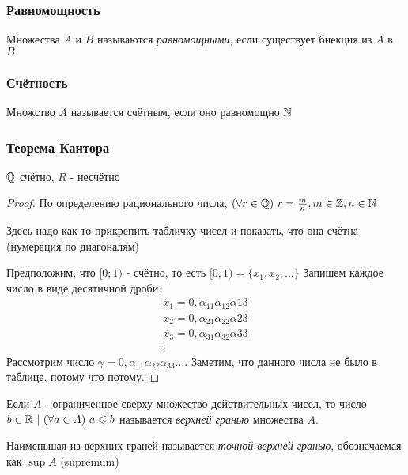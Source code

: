 \subsubsection*{Равномощность}

\begin{definition}
    Множества $A$ и $B$ называются \textit{равномощными}, если существует биекция из $A$ в $B$
\end{definition}

\subsubsection*{Счётность}

\begin{definition}
    Множство $A$ называется счётным, если оно равномощно $\mathbb{N}$
\end{definition}

\subsubsection*{Теорема Кантора}

\begin{proposition}
    $\mathbb{Q}$ счётно, $R$ - несчётно
\end{proposition}

\begin{proof}
    По определению рационального числа, $(\forall r \in \mathbb{Q})\ r = \frac{m}{n}, m \in \mathbb{Z}, n \in \mathbb{N}$
    
    Здесь надо как-то прикрепить табличку чисел и показать, что она счётна (нумерация по диагоналям)
    
    Предположим, что $[0; 1)$ - счётно, то есть $[0, 1) = \{x_1, x_2, \dots\}$
    Запишем каждое число в виде десятичной дроби:
    \begin{align*}
        x_1 = 0, \alpha_{11} \alpha_{12} \alpha{13} \\
        x_2 = 0, \alpha_{21} \alpha_{22} \alpha{23} \\
        x_3 = 0, \alpha_{31} \alpha_{32} \alpha{33} \\
        \vdots
    \end{align*}
    Рассмотрим число $\gamma = 0, \alpha_{11} \alpha_{22} \alpha_{33} \dots$. Заметим, что данного числа не было в таблице, потому что потому.
\end{proof}

\begin{definition}
    Если $A$ - ограниченное сверху множество действительных чисел, то число $b \in \mathbb{R}\ |\ (\forall a \in A)\ a \leqslant b$ называется \textit{верхней гранью} множества $A$.
    
    Наименьшая из верхних граней называется \textit{точной верхней гранью}, обозначаемая как $\sup A$ (supremum)
\end{definition}

